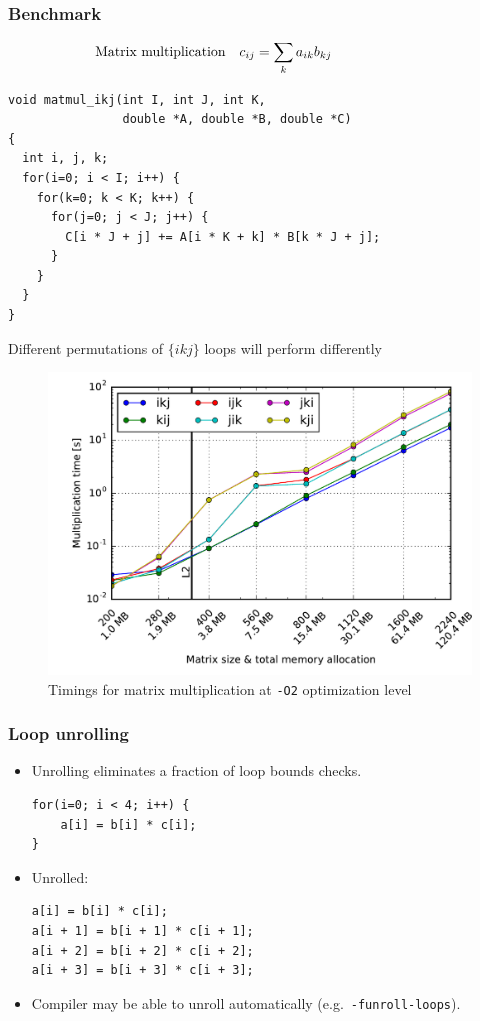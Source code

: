 \documentclass[usenames,dvipsnames,mathserif,compress]{beamer}
\begin{document}
\begin{frame}[fragile]
  \frametitle{Benchmark}
  \begin{align}
    \hspace{-2cm} \textrm{Matrix multiplication}\quad c_{ij} &= \sum_k a_{ik} b_{kj}\nonumber
  \end{align}
\begin{lstlisting}
void matmul_ikj(int I, int J, int K,
                double *A, double *B, double *C)
{
  int i, j, k;
  for(i=0; i < I; i++) {
    for(k=0; k < K; k++) {
      for(j=0; j < J; j++) {
        C[i * J + j] += A[i * K + k] * B[k * J + j];
      }
    }
  }
}
\end{lstlisting}
Different permutations of $\{ikj\}$ loops will perform differently
\end{frame}


\begin{frame}
  \begin{figure}
  \includegraphics[width=.95\textwidth]{code/timings-matmul}
  \caption{Timings for matrix multiplication
  at \texttt{-O2} optimization level}
  \end{figure}
\end{frame}


\begin{frame}[fragile]
\frametitle{Loop unrolling}
\begin{itemize}
\item Unrolling eliminates a fraction of loop bounds checks.
\begin{lstlisting}
for(i=0; i < 4; i++) {
    a[i] = b[i] * c[i];
}
\end{lstlisting}
\item Unrolled:
\begin{lstlisting}
a[i] = b[i] * c[i];
a[i + 1] = b[i + 1] * c[i + 1];
a[i + 2] = b[i + 2] * c[i + 2];
a[i + 3] = b[i + 3] * c[i + 3];
\end{lstlisting}
\item Compiler may be able to unroll automatically (e.g.~\texttt{-funroll-loops}).
\end{itemize}
\end{frame}
\end{document}
